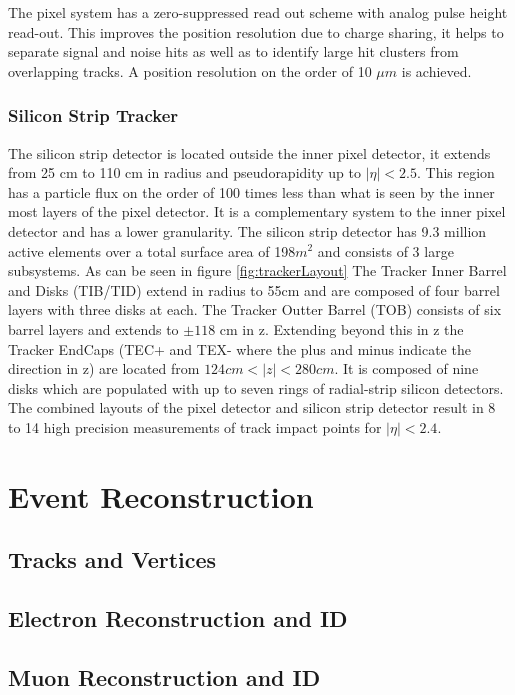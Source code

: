 \documentclass[oneside, letterpaper, 12pt, oldfontcommands]{memoir}
\begin{document}
The pixel system has a zero-suppressed read out scheme with analog pulse
height read-out. This improves the position resolution due to charge sharing,
it helps to separate signal and noise hits as well as to identify large hit 
clusters from overlapping tracks.
A position resolution on the order of 10 $\mu m$ is achieved.

\subsection{Silicon Strip Tracker}
The silicon strip detector is located outside the inner pixel detector, 
it extends from 25 cm to 110 cm in radius and pseudorapidity up to $|\eta|<2.5$. 
This region has a particle flux on 
the order of 100 times less than what is seen by the inner most layers of 
the pixel detector. It is a complementary system to the inner pixel
detector and has a lower granularity. The silicon strip detector 
has 9.3 million active elements over a total surface area of 198$m^{2}$
and consists of 3 large subsystems. As can be seen in figure \ref{fig:trackerLayout}
The Tracker Inner Barrel and Disks (TIB/TID) extend in radius to
55cm and are composed of four barrel layers with three disks at each.
The Tracker Outter Barrel (TOB) consists of six barrel layers and extends to $\pm118$ cm
in z. Extending beyond this in z the Tracker EndCaps (TEC+ and TEX- where the plus and minus
indicate the direction in z) are located from $124cm<|z|<280cm$. It is composed of 
nine disks which are populated with up to seven rings of radial-strip silicon detectors.
The combined layouts of the pixel detector and silicon strip detector
result in 8 to 14 high precision measurements of track impact points for 
$|\eta|<2.4$.


\chapter{Event Reconstruction}
\section{Tracks and Vertices}
\section{Electron Reconstruction and ID}
\section{Muon Reconstruction and ID}
\end{document}
